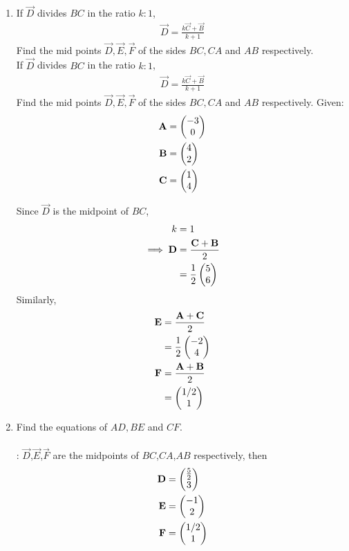 \documentclass[11pt]{book}
\begin{document}
\begin{enumerate}[label=\thesection.\arabic*.,ref=\thesection.\theenumi]

\item  If $\vec{D}$ divides $BC$ in the ratio $k : 1$,
		\begin{align}
			\vec{D}= \frac{k\vec{C}+\vec{B}}{k+1}
		\end{align}
Find the mid points $\vec{D}, \vec{E}, \vec{F}$ of the sides $BC, CA$ and $AB$ respectively.\\
If $\vec{D}$ divides $BC$ in the ratio $k : 1$,
\begin{align}
\vec{D}= \frac{k\vec{C}+\vec{B}}{k+1}
\end{align}
Find the mid points $\vec{D}, \vec{E}, \vec{F}$ of the sides $BC, CA$ and $AB$ respectively.
\newline
Given:
\begin{align}
\mathbf{A} &= \begin{pmatrix}-3\\0\\\end{pmatrix}\\
\mathbf{B} &= \begin{pmatrix}4\\2\\\end{pmatrix}\\
\mathbf{C} &= \begin{pmatrix}1\\4\\\end{pmatrix}
\end{align}

\solution
Since $\vec{D}$ is the midpoint of $BC$,
\begin{align}
k &= 1\\
\implies \mathbf{D} &= \frac{\mathbf{C} + \mathbf{B}}{2}\\
&= \frac{1}{2}\begin{pmatrix}5\\6\end{pmatrix}
\end{align}
Similarly,
\begin{align}
\mathbf{E} &= \frac{\mathbf{A} + \mathbf{C}}{2}\\
&= \frac{1}{2}\begin{pmatrix}-2\\4\end{pmatrix}\\
\mathbf{F} &= \frac{\mathbf{A} + \mathbf{B}}{2}\\
&= \begin{pmatrix}1/2\\1\end{pmatrix}
\end{align} 

\item Find the equations of $AD, BE$ and $CF$.\\
\\ \solution:
$\vec{D}$,$\vec{E}$,$\vec{F}$ are the midpoints of $BC$,$CA$,$AB$ respectively, then\\
\begin{align}
 \mathbf{D} &=  \begin{pmatrix}\frac{5}{2}\\3\end{pmatrix}\\
 \mathbf{E} &=  \begin{pmatrix}-1\\2\end{pmatrix}\\
 \mathbf{F} &= \begin{pmatrix}1/2\\1\end{pmatrix}
\end{align}
\begin{enumerate}


\end{enumerate}
\end{enumerate}
\end{document}
